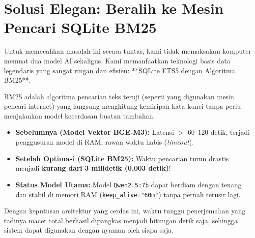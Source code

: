 \section{Solusi Elegan: Beralih ke Mesin Pencari SQLite BM25}
Untuk memecahkan masalah ini secara tuntas, kami tidak memaksakan komputer memuat dua model AI sekaligus. Kami memanfaatkan teknologi basis data legendaris yang sangat ringan dan efisien: **SQLite FTS5 dengan Algoritma BM25**.

BM25 adalah algoritma pencarian teks teruji (seperti yang digunakan mesin pencari internet) yang langsung menghitung kemiripan kata kunci tanpa perlu menjalankan model kecerdasan buatan tambahan.

\begin{metricbox}
\begin{itemize}
    \item \textbf{Sebelumnya (Model Vektor BGE-M3):} Latensi $>$ 60--120 detik, terjadi penggusuran model di RAM, rawan waktu habis (\textit{timeout}).
    \item \textbf{Setelah Optimasi (SQLite BM25):} Waktu pencarian turun drastis menjadi \textbf{kurang dari 3 milidetik (0,003 detik)}!
    \item \textbf{Status Model Utama:} Model \texttt{Qwen2.5:7b} dapat berdiam dengan tenang dan stabil di memori RAM (\texttt{keep\_alive="60m"}) tanpa pernah terusir lagi.
\end{itemize}
\end{metricbox}

Dengan keputusan arsitektur yang cerdas ini, waktu tunggu penerjemahan yang tadinya macet total berhasil dipangkas menjadi hitungan detik saja, sehingga sistem dapat digunakan dengan nyaman oleh siapa saja.
